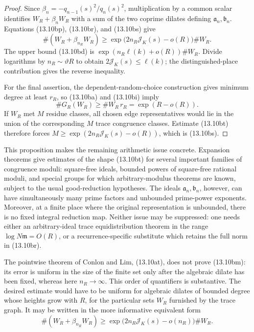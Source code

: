 \documentclass[11pt,reqno]{amsart}
\theoremstyle{definition}
\theoremstyle{remark}
\begin{document}
\begin{proof}
Since \(\beta_n=-q_{n-1}(s)^2/q_n(s)^2\), multiplication by a common
scalar identifies \(W_R+\beta_nW_R\) with a sum of the two coprime
dilates defining \(\mathfrak a_n,\mathfrak b_n\).  Equations
(13.10bp), (13.10br), and (13.10bs) give
\[
 \#(W_R+\beta_{n_R}W_R)
 \ge
 \exp\bigl(2n_R\mathcal J_K(s)-o(R)\bigr)\#W_R.
\]
The upper bound (13.10bd) is
\(\exp(n_R\ell(k)+o(R))\#W_R\).  Divide logarithms by
\(n_R\sim\vartheta R\) to obtain
\(2\mathcal J_K(s)\le\ell(k)\); the distinguished-place contribution
gives the reverse inequality.

For the final assertion, the dependent-random-choice construction gives
minimum degree at least \(r_R\), so (13.10ba) and (13.10bi) imply
\[
 \#G_R(W_R)\ge\#W_R\,r_R=\exp(R-o(R)).
\]
If \(W_R\) met \(M\) residue classes, all chosen edge representatives
would lie in the union of the corresponding \(M\) trace congruence
classes.  Estimate (13.10bt) therefore forces
\(M\ge\exp(2n_R\mathcal J_K(s)-o(R))\), which is (13.10bs).
\end{proof}

This proposition makes the remaining arithmetic issue concrete.  Expansion
theorems give estimates of the shape (13.10bt) for several important
families of congruence moduli: square-free ideals, bounded powers of
square-free rational moduli, and special groups for which arbitrary-modulus
theorems are known, subject to the usual good-reduction hypotheses.  The
ideals \(\mathfrak a_n,\mathfrak b_n\), however, can have
simultaneously many prime factors and unbounded prime-power exponents.
Moreover, at a finite place where the original representation is unbounded,
there is no fixed integral reduction map.  Neither issue may be suppressed:
one needs either an arbitrary-ideal trace equidistribution theorem in the
range \(\log N\mathfrak m=O(R)\), or a recurrence-specific substitute which
retains the full norm in (13.10br).

The pointwise theorem of Conlon and Lim, (13.10at), does not prove
(13.10bm): its error is uniform in the size of the finite set only after
the algebraic dilate has been fixed, whereas here \(n_R\to\infty\).
This order of quantifiers is substantive.  The desired estimate would have
to be uniform for algebraic dilates of bounded degree whose heights grow
with \(R\), for the particular sets \(W_R\) furnished by the trace graph.
It may be written in the more
informative equivalent form
\[
 \#(W_R+\beta_{n_R}W_R)
 \ge
 \exp\bigl(2n_R\mathcal J_K(s)-o(n_R)\bigr)\#W_R.
\tag{13.10bo}
\]
\end{document}

